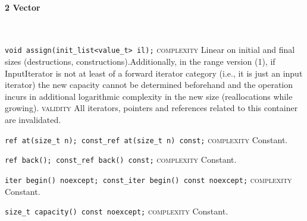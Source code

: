 \paragraph{2 Vector}\mbox{}\vspace{0.5em}\\
\noindent{}\hspace*{0.25em}\lstinline[basicstyle=\ttfamily\color{corange}]{void assign(init_list<value_t> il);} \textsc{complexity} Linear on initial and final sizes (destructions, constructions).Additionally, in the range version (1), if InputIterator is not at least of a forward iterator category (i.e., it is just an input iterator) the new capacity cannot be determined beforehand and the operation incurs in additional logarithmic complexity in the new size (reallocations while growing). \textsc{validity} All iterators, pointers and references related to this container are invalidated.\\\vspace{-0.6em}

\noindent{}\hspace*{0.25em}\lstinline[basicstyle=\ttfamily\color{cgreen}]{ref at(size_t n); const_ref at(size_t n) const;} \textsc{complexity} Constant.\\\vspace{-0.6em}

\noindent{}\hspace*{0.25em}\lstinline[basicstyle=\ttfamily\color{cgreen}]{ref back(); const_ref back() const;} \textsc{complexity} Constant.\\\vspace{-0.6em}

\noindent{}\hspace*{0.25em}\lstinline[basicstyle=\ttfamily\color{cgreen}]{iter begin() noexcept; const_iter begin() const noexcept;} \textsc{complexity} Constant.\\\vspace{-0.6em}

\noindent{}\hspace*{0.25em}\lstinline[basicstyle=\ttfamily\color{cgreen}]{size_t capacity() const noexcept;} \textsc{complexity} Constant.\\\vspace{-0.6em}

